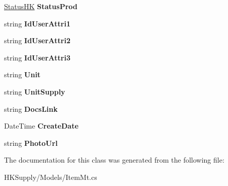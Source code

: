 \begin{DoxyCompactItemize}
\item 
\mbox{\label{class_h_k_supply_1_1_models_1_1_item_mt_aa11c88d6d49000e0243491bd75d97478}} 
\mbox{\hyperlink{class_h_k_supply_1_1_models_1_1_status_h_k}{Status\+HK}} {\bfseries Status\+Prod}
\item 
\mbox{\label{class_h_k_supply_1_1_models_1_1_item_mt_ab672175ca9a3cabdf47f3b7d77e24111}} 
string {\bfseries Id\+User\+Attri1}
\item 
\mbox{\label{class_h_k_supply_1_1_models_1_1_item_mt_a3d83adb1dd25386ccaeb3af04d428a27}} 
string {\bfseries Id\+User\+Attri2}
\item 
\mbox{\label{class_h_k_supply_1_1_models_1_1_item_mt_a6eacc5068467154fd55ee9ec1dd4c185}} 
string {\bfseries Id\+User\+Attri3}
\item 
\mbox{\label{class_h_k_supply_1_1_models_1_1_item_mt_adb7adea05a050ddc99b48232155cd5e6}} 
string {\bfseries Unit}
\item 
\mbox{\label{class_h_k_supply_1_1_models_1_1_item_mt_a1b27defc53fba28ead412d25aa6c9488}} 
string {\bfseries Unit\+Supply}
\item 
\mbox{\label{class_h_k_supply_1_1_models_1_1_item_mt_a2abd32a52473c8a8be001b3b8bbe6679}} 
string {\bfseries Docs\+Link}
\item 
\mbox{\label{class_h_k_supply_1_1_models_1_1_item_mt_a237f5ee771fee6a695bafe4d0dae309c}} 
Date\+Time {\bfseries Create\+Date}
\item 
\mbox{\label{class_h_k_supply_1_1_models_1_1_item_mt_a5b5536c664dd554f90b4c0cc219f156d}} 
string {\bfseries Photo\+Url}
\end{DoxyCompactItemize}


The documentation for this class was generated from the following file\+:\begin{DoxyCompactItemize}
\item 
H\+K\+Supply/\+Models/Item\+Mt.\+cs\end{DoxyCompactItemize}
